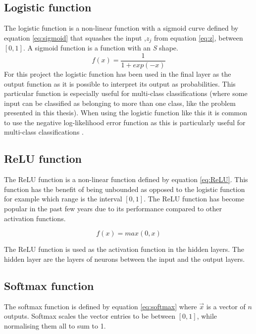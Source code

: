 \subsection{Logistic function}\label{sec:sigmoid_function}
The logistic function is a non-linear function with a sigmoid curve defined by equation \ref{eq:sigmoid} that squashes the input ,$z_j$ from equation \ref{eq:z}, between $[0, 1]$. A sigmoid function is a function with an \textit{S} shape.
\begin{equation}\label{eq:sigmoid}
    f(x)=\frac{1}{1+exp(-x)}
\end{equation}
For this project the logistic function has been used in the final layer as the output function as it is possible to interpret its output as probabilities. This particular function is especially useful for multi-class classifications (where some input can be classified as belonging to more than one class, like the problem presented in this thesis). When using the logistic function like this it is common to use the negative log-likelihood error function as this is particularly useful for multi-class classifications \parencite{bishop1995neural}.

\subsection{ReLU function}
The ReLU function is a non-linear function defined by equation \ref{eq:ReLU}. This function has the benefit of being unbounded as opposed to the logistic function for example which range is the interval $[0, 1]$. The ReLU function has become popular in the past few years due to its performance compared to other activation functions. \parencite{glorot2011deep}

\begin{equation}\label{eq:ReLU}
    f(x) = max(0,x)
\end{equation}

The ReLU function is used as the activation function in the hidden layers. The hidden layer are the layers of neurons between the input and the output layers.
\subsection{Softmax function}\label{sec:softmax_function}
The softmax function is defined by equation \ref{eq:softmax} where $\vec{x}$ is a vector of $n$ outputs. Softmax scales the vector entries to be between $[0,1]$, while normalising them all to sum to 1.

